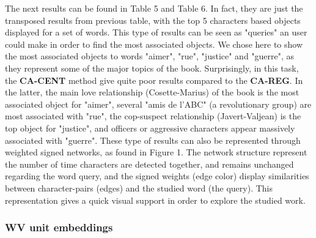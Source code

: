 \documentclass[
twocolumn,
]{ceurart}
\begin{document}
The next results can be found in Table 5 and Table 6. In fact, they are just the transposed results from previous table, with the top 5 characters based objects displayed for a set of words. This type of results can be seen as "queries" an user could make in order to find the most associated objects. We chose here to show the most associated objects to words "aimer", "rue", "justice" and "guerre", as they represent some of the major topics of the book. Surprisingly, in this task, the \textbf{CA-CENT} method give quite poor results compared to the \textbf{CA-REG}. In the latter, the main love relationship (Cosette-Marius) of the book is the most associated object for "aimer", several "amis de l'ABC" (a revolutionary group) are most associated with "rue", the cop-suspect relationship (Javert-Valjean) is the top object for "justice", and officers or aggressive characters appear massively associated with "guerre". These type of results can also be represented through weighted signed networks, as found in Figure 1. The network structure represent the number of time characters are detected together, and remains unchanged regarding the word query, and the signed weights (edge color) display similarities between character-pairs (edges) and the studied word (the query). This representation gives a quick visual support in order to explore the studied work.

\subsubsection{WV unit embeddings}


\end{document}
